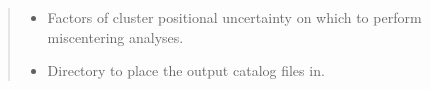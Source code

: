 \documentclass[letterpaper,12pt,english]{sphinxmanual}
\begin{document}
\begin{fulllineitems}
\begin{fulllineitems}
\begin{quote}
\begin{description}
\begin{itemize}
\item {} 
\sphinxAtStartPar
{} \textendash{} Factors of cluster positional uncertainty on which to perform miscentering analyses.

\item {} 
\sphinxAtStartPar
{} \textendash{} Directory to place the output catalog files in.

\end{itemize}

\end{description}\end{quote}

\end{fulllineitems}



\end{fulllineitems}
\end{document}
